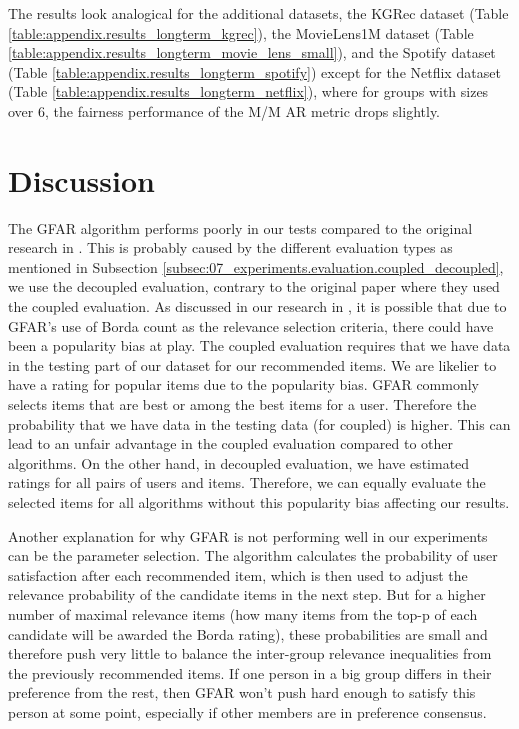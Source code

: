 The results look analogical for the additional datasets, the KGRec dataset (Table \ref{table:appendix.results_longterm_kgrec}), 
the MovieLens1M dataset (Table \ref{table:appendix.results_longterm_movie_lens_small}), 
and the Spotify dataset (Table \ref{table:appendix.results_longterm_spotify}) 
except for the Netflix dataset (Table \ref{table:appendix.results_longterm_netflix}), where for groups with sizes over 6, the fairness performance of the M/M AR metric drops slightly.

\section{Discussion} \label{sec:experiments.discussion}

The GFAR algorithm performs poorly in our tests compared to the original research in \cite{GFAR-kaya2020}. This is probably caused by the different evaluation types as mentioned in Subsection \ref{subsec:07_experiments.evaluation.coupled_decoupled}, we use the decoupled evaluation, contrary to the original paper where they used the coupled evaluation. As discussed in our research in \cite{peska2021coupled}, it is possible that due to GFAR's use of Borda count as the relevance selection criteria, there could have been a popularity bias at play. The coupled evaluation requires that we have data in the testing part of our dataset for our recommended items. We are likelier to have a rating for popular items due to the popularity bias. GFAR commonly selects items that are best or among the best items for a user. Therefore the probability that we have data in the testing data (for coupled) is higher. This can lead to an unfair advantage in the coupled evaluation compared to other algorithms. On the other hand, in decoupled evaluation, we have estimated ratings for all pairs of users and items. Therefore, we can equally evaluate the selected items for all algorithms without this popularity bias affecting our results.

Another explanation for why GFAR is not performing well in our experiments can be the parameter selection. The algorithm calculates the probability of user satisfaction after each recommended item, which is then used to adjust the relevance probability of the candidate items in the next step. But for a higher number of maximal relevance items (how many items from the top-p of each candidate will be awarded the Borda rating), these probabilities are small and therefore push very little to balance the inter-group relevance inequalities from the previously recommended items. If one person in a big group differs in their preference from the rest, then GFAR won't push hard enough to satisfy this person at some point, especially if other members are in preference consensus.


